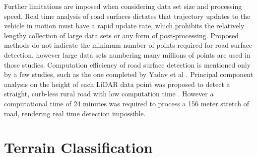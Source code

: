 \documentclass[numbered,pdftex]{ohio-etd}
\begin{document}
{{		{Further limitations are imposed when considering data set size and processing speed. Real time analysis of road surfaces dictates that trajectory updates to the vehicle in motion must have a rapid update rate, which prohibits the relatively lengthy collection of large data sets or any form of post-processing. Proposed methods \cite{yadav_extraction_2017,yadav_road_2018,yadav_rural_2018,yadav_pole-shaped_2015,miyazaki_line-based_2014,yang_semi-automated_2013,liu_new_2013,qiu_fast_2016} do not indicate the minimum number of points required for road surface detection, however large data sets numbering many millions of points are used in those studies. Computation efficiency of road surface detection is mentioned only by a few studies, such as the one completed by Yadav et al \cite{yadav_road_2018}. Principal component analysis on the height of each LiDAR data point was proposed to detect a straight, curb-less rural road with low computation time \cite{yadav_road_2018}. However a computational time of 24 minutes was required to process a 156 meter stretch of road, rendering real time detection impossible.} 
			
	} %
	
%	
%	
	
	\section{Terrain Classification}{
		
}}
\end{document}
